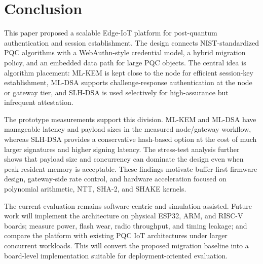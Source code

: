 \documentclass[conference,10pt,letterpaper]{IEEEtran}
\begin{document}
\section{Conclusion}

This paper proposed a scalable Edge-IoT platform for post-quantum authentication and session establishment. The design connects NIST-standardized PQC algorithms with a WebAuthn-style credential model, a hybrid migration policy, and an embedded data path for large PQC objects. The central idea is algorithm placement: ML-KEM is kept close to the node for efficient session-key establishment, ML-DSA supports challenge-response authentication at the node or gateway tier, and SLH-DSA is used selectively for high-assurance but infrequent attestation.

The prototype measurements support this division. ML-KEM and ML-DSA have manageable latency and payload sizes in the measured node/gateway workflow, whereas SLH-DSA provides a conservative hash-based option at the cost of much larger signatures and higher signing latency. The stress-test analysis further shows that payload size and concurrency can dominate the design even when peak resident memory is acceptable. These findings motivate buffer-first firmware design, gateway-side rate control, and hardware acceleration focused on polynomial arithmetic, NTT, SHA-2, and SHAKE kernels.

The current evaluation remains software-centric and simulation-assisted. Future work will implement the architecture on physical ESP32, ARM, and RISC-V boards; measure power, flash wear, radio throughput, and timing leakage; and compare the platform with existing PQC IoT architectures under larger concurrent workloads. This will convert the proposed migration baseline into a board-level implementation suitable for deployment-oriented evaluation.



\end{document}
